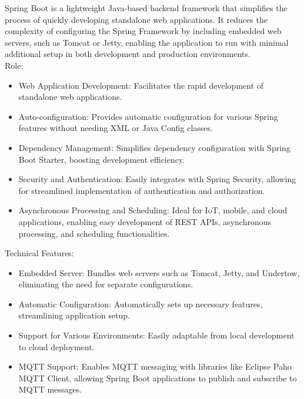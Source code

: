 \documentclass[conference]{IEEEtran}
\begin{document}
\noindent Spring Boot is a lightweight Java-based backend framework that simplifies the process of quickly developing standalone web applications. It reduces the complexity of configuring the Spring Framework by including embedded web servers, such as Tomcat or Jetty, enabling the application to run with minimal additional setup in both development and production environments.\\

Role:
\begin{itemize}
\item Web Application Development: Facilitates the rapid development of standalone web applications.\\
\item Auto-configuration: Provides automatic configuration for various Spring features without needing XML or Java Config classes.\\
\item  Dependency Management: Simplifies dependency configuration with Spring Boot Starter, boosting development efficiency. \\
\item Security and Authentication: Easily integrates with Spring Security, allowing for streamlined implementation of authentication and authorization. \\
\item Asynchronous Processing and Scheduling: Ideal for IoT, mobile, and cloud applications, enabling easy development of REST APIs, asynchronous processing, and scheduling functionalities. \\
\end{itemize}

Technical Features: 
\begin{itemize}
    \item Embedded Server: Bundles web servers such as Tomcat, Jetty, and Undertow, eliminating the need for separate configurations.\\
    \item Automatic Configuration: Automatically sets up necessary features, streamlining application setup.\\
    \item Support for Various Environments: Easily adaptable from local development to cloud deployment.\\
    \item MQTT Support: Enables MQTT messaging with libraries like Eclipse Paho MQTT Client, allowing Spring Boot applications to publish and subscribe to MQTT messages.\\
\end{itemize}
\end{document}
